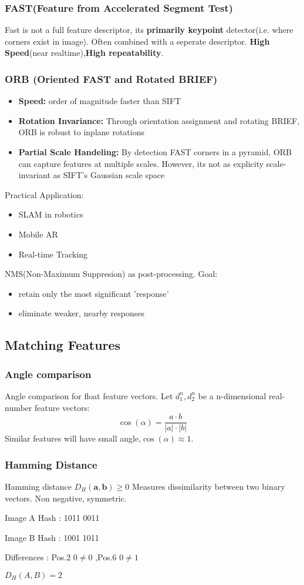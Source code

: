 \subsubsection{FAST(Feature from Accelerated Segment Test)}
Fast is not a full feature descriptor, its \textbf{primarily keypoint} detector(i.e. where corners exist in image). Often combined with a seperate descriptor.
\textbf{High Speed}(near realtime),\textbf{High repeatability}.

\subsubsection{ORB (Oriented FAST and Rotated BRIEF)}
\begin{itemize}
    \item \textbf{Speed:} order of magnitude faster than SIFT
    \item \textbf{Rotation Invariance:} Through orientation assignment and rotating BRIEF, ORB is robust to inplane rotations
    \item \textbf{Partial Scale Handeling:} By detection FAST corners in a pyramid, ORB can capture features at multiple scales. However, its not as explicity scale-invariant as SIFT's Gaussian scale space
\end{itemize}
Practical Application:
\begin{itemize}
    \item SLAM in robotics
    \item Mobile AR
    \item Real-time Tracking
\end{itemize}
NMS(Non-Maximum Suppresion) as post-processing. Goal:
\begin{itemize}
    \item retain only the most significant 'response'
    \item eliminate weaker, nearby responses
\end{itemize}
\subsection{Matching Features}
\subsubsection{Angle comparison}
Angle comparison for float feature vectors. Let \(d_1^n,d_2^n\) be a n-dimensional real-number feature vectors:
\[
\cos(\alpha) = \frac{a\cdot b}{|a|\cdot|b|}
\]
Similar features will have small angle,\(\cos(\alpha) \approx 1\).
\subsubsection{Hamming Distance}
Hamming distance \(D_H(\mathbf{a},\mathbf{b}) \ge 0\) Measures dissimilarity between two binary vectors. Non negative, symmetric.

Image A Hash : 1011 0011

Image B Hash : 1001 1011

Differences : Pos.2 \quad $0 \neq 0$ ,Pos.6 \quad $0 \neq 1$

\(D_H(A,B) = 2\)


